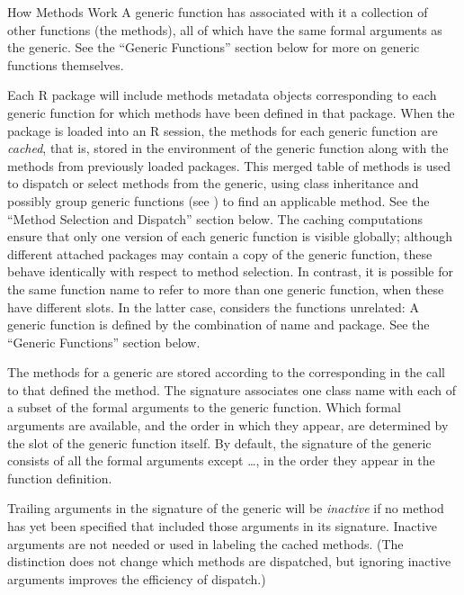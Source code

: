 %
\begin{Section}{How Methods Work}
A generic function  has associated with it a
collection of other functions (the methods), all of which have the same
formal arguments as the generic.  See the ``Generic
Functions'' section below for more on generic functions themselves.

Each R package will include  methods metadata objects
corresponding to each generic function  for which methods have been
defined in that package.
When the package is loaded into an R session, the methods for each
generic function are \emph{cached}, that is, stored in the
environment of the generic function along with the methods from
previously loaded packages.  This merged table of methods is used to
dispatch or select methods from the generic, using class inheritance
and possibly group generic functions (see
) to find an applicable method.
See the ``Method Selection and Dispatch'' section below.
The caching computations ensure that only one version of each
generic function is visible globally; although different attached
packages may contain a copy of the generic function, these behave
identically with respect to method selection.
In contrast, it is possible for the same function name to refer to
more than one generic function, when these have different
 slots.  In the latter case, \R{} considers the
functions unrelated:  A generic function is defined by the
combination of name and package.  See the ``Generic Functions''
section below.

The methods for a generic are stored according to the
corresponding  in the call to 
that defined  the method.  The signature associates one
class name with each of a subset of the formal arguments to the
generic function.  Which formal arguments are available, and the
order in which they appear, are determined by the 
slot of the generic function itself.  By default, the signature of the
generic consists of all the formal arguments except \dots, in the
order they appear in the function definition.

Trailing arguments in the signature of the generic will be \emph{inactive}  if no
method has yet been specified that included those arguments in its signature.
Inactive arguments are not needed or used in labeling the cached
methods.  (The distinction does not change which methods are
dispatched, but ignoring inactive arguments improves the
efficiency of dispatch.)


\end{Section}

